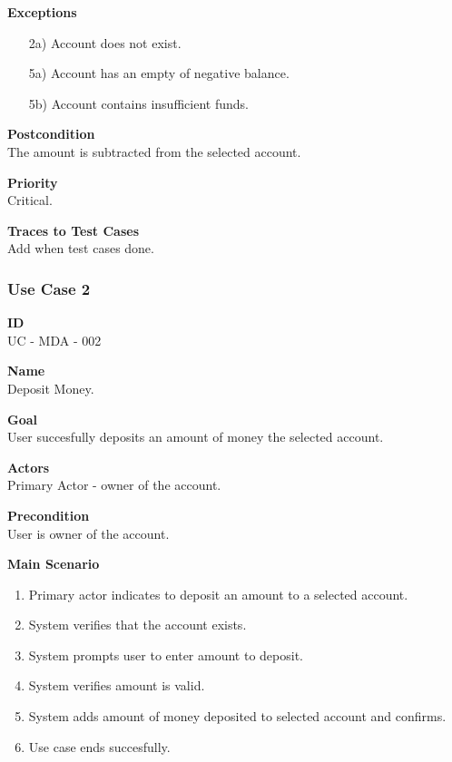 \documentclass[12pt]{article}
\begin{document}
\noindent
    {\bf Exceptions}\\
    \vspace*{-0.2in}
\begin{itemize}
    \item[2a)] Account does not exist.
    \item[5a)] Account has an empty of negative balance.
    \item[5b)] Account contains insufficient funds.
\end{itemize}
    

\noindent
{\bf Postcondition}\\
The amount is subtracted from the selected account.

\noindent
{\bf Priority}\\
Critical.   

\noindent
{\bf Traces to Test Cases}\\
Add when test cases done.

\subsubsection{Use Case 2} \label{uc:2}

\noindent
{\bf ID}\\
UC - MDA - 002

\noindent
{\bf Name}\\
Deposit Money.

\noindent
{\bf Goal}\\
User succesfully deposits an amount of money the selected account.

\noindent
{\bf Actors}\\
Primary Actor - owner of the account.

\noindent
{\bf Precondition}\\
User is owner of the account.

\noindent
{\bf Main Scenario}\\
\vspace*{-0.2in}
\begin{enumerate}
  \item Primary actor indicates to deposit an amount to a selected account.
  \item System verifies that the account exists.
  \item System prompts user to enter amount to deposit.
  \item System verifies amount is valid.
  \item System adds amount of money deposited to selected account and confirms.
  \item Use case ends succesfully.
\end{enumerate}
\end{document}
